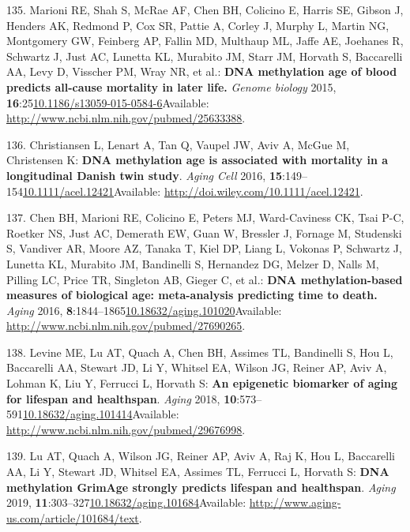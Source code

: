 \documentclass[
]{book}
\begin{document}
\leavevmode\hypertarget{ref-Marioni2015}{}%
135. Marioni RE, Shah S, McRae AF, Chen BH, Colicino E, Harris SE, Gibson J, Henders AK, Redmond P, Cox SR, Pattie A, Corley J, Murphy L, Martin NG, Montgomery GW, Feinberg AP, Fallin MD, Multhaup ML, Jaffe AE, Joehanes R, Schwartz J, Just AC, Lunetta KL, Murabito JM, Starr JM, Horvath S, Baccarelli AA, Levy D, Visscher PM, Wray NR, et al.: \textbf{DNA methylation age of blood predicts all-cause mortality in later life.} \emph{Genome biology} 2015, \textbf{16}:25\href{https://doi.org/10.1186/s13059-015-0584-6}{10.1186/s13059-015-0584-6}Available: \url{http://www.ncbi.nlm.nih.gov/pubmed/25633388}.

\leavevmode\hypertarget{ref-Christiansen2016}{}%
136. Christiansen L, Lenart A, Tan Q, Vaupel JW, Aviv A, McGue M, Christensen K: \textbf{DNA methylation age is associated with mortality in a longitudinal Danish twin study}. \emph{Aging Cell} 2016, \textbf{15}:149--154\href{https://doi.org/10.1111/acel.12421}{10.1111/acel.12421}Available: \url{http://doi.wiley.com/10.1111/acel.12421}.

\leavevmode\hypertarget{ref-Chen2016a}{}%
137. Chen BH, Marioni RE, Colicino E, Peters MJ, Ward-Caviness CK, Tsai P-C, Roetker NS, Just AC, Demerath EW, Guan W, Bressler J, Fornage M, Studenski S, Vandiver AR, Moore AZ, Tanaka T, Kiel DP, Liang L, Vokonas P, Schwartz J, Lunetta KL, Murabito JM, Bandinelli S, Hernandez DG, Melzer D, Nalls M, Pilling LC, Price TR, Singleton AB, Gieger C, et al.: \textbf{DNA methylation-based measures of biological age: meta-analysis predicting time to death.} \emph{Aging} 2016, \textbf{8}:1844--1865\href{https://doi.org/10.18632/aging.101020}{10.18632/aging.101020}Available: \url{http://www.ncbi.nlm.nih.gov/pubmed/27690265}.

\leavevmode\hypertarget{ref-Levine2018}{}%
138. Levine ME, Lu AT, Quach A, Chen BH, Assimes TL, Bandinelli S, Hou L, Baccarelli AA, Stewart JD, Li Y, Whitsel EA, Wilson JG, Reiner AP, Aviv A, Lohman K, Liu Y, Ferrucci L, Horvath S: \textbf{An epigenetic biomarker of aging for lifespan and healthspan}. \emph{Aging} 2018, \textbf{10}:573--591\href{https://doi.org/10.18632/aging.101414}{10.18632/aging.101414}Available: \url{http://www.ncbi.nlm.nih.gov/pubmed/29676998}.

\leavevmode\hypertarget{ref-Lu2019}{}%
139. Lu AT, Quach A, Wilson JG, Reiner AP, Aviv A, Raj K, Hou L, Baccarelli AA, Li Y, Stewart JD, Whitsel EA, Assimes TL, Ferrucci L, Horvath S: \textbf{DNA methylation GrimAge strongly predicts lifespan and healthspan}. \emph{Aging} 2019, \textbf{11}:303--327\href{https://doi.org/10.18632/aging.101684}{10.18632/aging.101684}Available: \url{http://www.aging-us.com/article/101684/text}.
\end{document}
